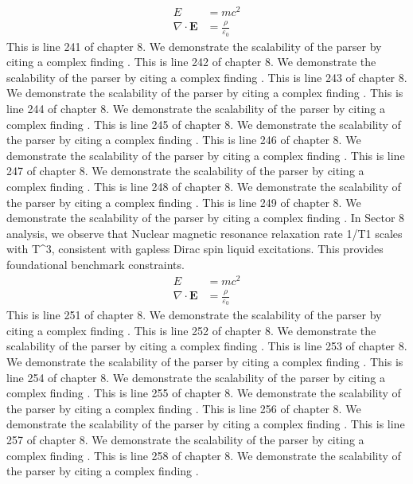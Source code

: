 \begin{align*}
  E &= mc^2 \\
  \nabla \cdot \mathbf{E} &= \frac{\rho}{\varepsilon_0}
\end{align*}
This is line 241 of chapter 8. We demonstrate the scalability of the parser by citing a complex finding \cite{ref8_241}.
This is line 242 of chapter 8. We demonstrate the scalability of the parser by citing a complex finding \cite{ref8_242}.
This is line 243 of chapter 8. We demonstrate the scalability of the parser by citing a complex finding \cite{ref8_243}.
This is line 244 of chapter 8. We demonstrate the scalability of the parser by citing a complex finding \cite{ref8_244}.
This is line 245 of chapter 8. We demonstrate the scalability of the parser by citing a complex finding \cite{ref8_245}.
This is line 246 of chapter 8. We demonstrate the scalability of the parser by citing a complex finding \cite{ref8_246}.
This is line 247 of chapter 8. We demonstrate the scalability of the parser by citing a complex finding \cite{ref8_247}.
This is line 248 of chapter 8. We demonstrate the scalability of the parser by citing a complex finding \cite{ref8_248}.
This is line 249 of chapter 8. We demonstrate the scalability of the parser by citing a complex finding \cite{ref8_249}.
In Sector 8 analysis, we observe that Nuclear magnetic resonance relaxation rate 1/T1 scales with T^3, consistent with gapless Dirac spin liquid excitations. This provides foundational benchmark constraints.
\begin{align*}
  E &= mc^2 \\
  \nabla \cdot \mathbf{E} &= \frac{\rho}{\varepsilon_0}
\end{align*}
This is line 251 of chapter 8. We demonstrate the scalability of the parser by citing a complex finding \cite{ref8_251}.
This is line 252 of chapter 8. We demonstrate the scalability of the parser by citing a complex finding \cite{ref8_252}.
This is line 253 of chapter 8. We demonstrate the scalability of the parser by citing a complex finding \cite{ref8_253}.
This is line 254 of chapter 8. We demonstrate the scalability of the parser by citing a complex finding \cite{ref8_254}.
This is line 255 of chapter 8. We demonstrate the scalability of the parser by citing a complex finding \cite{ref8_255}.
This is line 256 of chapter 8. We demonstrate the scalability of the parser by citing a complex finding \cite{ref8_256}.
This is line 257 of chapter 8. We demonstrate the scalability of the parser by citing a complex finding \cite{ref8_257}.
This is line 258 of chapter 8. We demonstrate the scalability of the parser by citing a complex finding \cite{ref8_258}.
